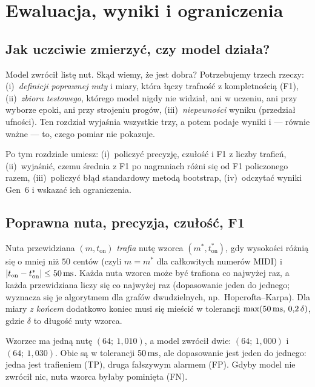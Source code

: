 \chapter{Ewaluacja, wyniki i ograniczenia}\label{rozdz:wyniki}

\section{Jak uczciwie zmierzyć, czy model działa?}

Model zwrócił listę nut. Skąd wiemy, że jest dobra? Potrzebujemy trzech rzeczy: (i)~\emph{definicji poprawnej nuty} i miary, która łączy trafność z kompletnością (F1), (ii)~\emph{zbioru testowego}, którego model nigdy nie widział, ani w uczeniu, ani przy wyborze epoki, ani przy strojeniu progów,
(iii)~\emph{niepewności} wyniku (przedział ufności). Ten rozdział wyjaśnia wszystkie trzy, a potem podaje wyniki i --- równie ważne --- to, czego pomiar nie pokazuje.

Po tym rozdziale umiesz: (i)~policzyć precyzję, czułość i F1 z liczby trafień, (ii)~wyjaśnić, czemu średnia z F1 po nagraniach różni się od F1 policzonego razem, (iii)~policzyć błąd standardowy metodą bootstrap, (iv)~odczytać wyniki Gen~6 i wskazać ich ograniczenia.

\section{Poprawna nuta, precyzja, czułość, F1}

\begin{definicja}[Trafienie]\label{def:trafienie}
Nuta przewidziana $(m,t_\mathrm{on})$ \emph{trafia} nutę wzorca $(m^\ast,t^\ast_\mathrm{on})$, gdy wysokości różnią się o mniej niż $50$ centów (czyli $m=m^\ast$ dla całkowitych numerów MIDI) i $\left\lvert t_\mathrm{on}-t^\ast_\mathrm{on}\right\rvert\le50\,\mathrm{ms}$.
Każda nuta wzorca może być trafiona co najwyżej raz, a każda przewidziana liczy się co najwyżej raz (dopasowanie jeden do jednego; wyznacza się je algorytmem dla grafów dwudzielnych, np.\ Hopcrofta--Karpa). Dla miary \emph{z końcem} dodatkowo koniec musi się mieścić w tolerancji $\max(50\,\mathrm{ms},\,0{,}2\,\delta)$, gdzie $\delta$ to długość nuty wzorca.
\end{definicja}

\begin{przyklad}\label{prz:trafienie}
Wzorzec ma jedną nutę $(64;\ 1{,}010)$, a model zwrócił dwie: $(64;\ 1{,}000)$ i $(64;\ 1{,}030)$. Obie są w tolerancji $50\,\mathrm{ms}$, ale dopasowanie jest jeden do jednego: jedna jest trafieniem (TP), druga fałszywym alarmem (FP). Gdyby model nie zwrócił nic, nuta wzorca byłaby pominięta (FN).
\end{przyklad}

